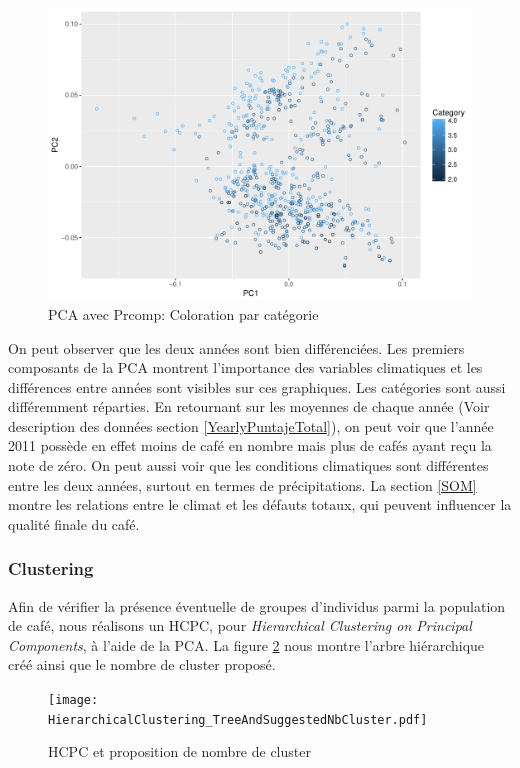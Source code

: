 \begin{figure}[H]
	\centering
	\includegraphics[width=0.7\linewidth]{img/PCA/PCACat}
	\caption{PCA avec Prcomp: Coloration par catégorie}
	\label{fig:pcacat}
\end{figure}





\noindent On peut observer que les deux années sont bien différenciées. Les premiers composants de la PCA montrent l'importance des variables climatiques et les différences entre années sont visibles sur ces graphiques. Les catégories sont aussi différemment réparties. En retournant sur les moyennes de chaque année (Voir description des données section \ref{YearlyPuntajeTotal}), on peut voir que l'année 2011 possède en effet moins de café en nombre mais plus de cafés ayant reçu la note de zéro. On peut aussi voir que les conditions climatiques sont différentes entre les deux années, surtout en termes de précipitations. La section \ref{SOM} montre les relations entre le climat et les défauts totaux, qui peuvent influencer la qualité finale du café.  %

\newpage
\subsubsection{Clustering} Afin de vérifier la présence éventuelle de groupes d'individus parmi la population de café, nous réalisons un HCPC, pour \textit{Hierarchical Clustering on Principal Components}, à l'aide de la PCA. La figure \ref{HCTSuggest} nous montre l'arbre hiérarchique créé ainsi que le nombre de cluster proposé. \\

\begin{figure}[H]
	\texttt{[image: HierarchicalClustering\_TreeAndSuggestedNbCluster.pdf]}
	\caption{\label{HCTSuggest} HCPC et proposition de nombre de cluster }
\end{figure}

